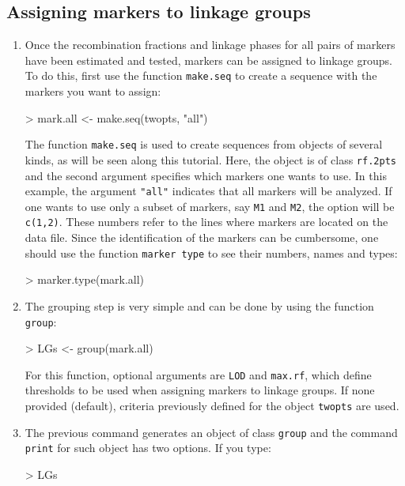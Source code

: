 \documentclass[letterpaper,12pt,oneside]{article}
\begin{document}
\subsection{Assigning markers to linkage groups}
\begin{enumerate}
\item Once the recombination fractions and linkage phases for all pairs of markers have been estimated and tested, markers can be assigned to linkage groups. To do this, first use the function {\tt make.seq} to create a sequence with the markers you want to assign:
\begin{Schunk}
\begin{Sinput}
> mark.all <- make.seq(twopts, "all")
\end{Sinput}
\end{Schunk}
The function {\tt make.seq} is used to create sequences from objects of several kinds, as will be seen along this tutorial. Here, the object is of class {\tt rf.2pts} and the second argument specifies which markers one wants to use. In this example, the argument {\tt "all"} indicates that all markers will be analyzed. If one wants to use only a subset of markers, say {\tt M1} and {\tt M2}, the option will be {\tt c(1,2)}. These numbers refer to the lines where markers are located on the data file. Since the identification of the markers can be cumbersome, one should use the function {\tt marker type} to see their numbers, names and types:

\begin{Schunk}
\begin{Sinput}
> marker.type(mark.all)
\end{Sinput}
\end{Schunk}

\item The grouping step is very simple and can be done by using the function {\tt group}:
\begin{Schunk}
\begin{Sinput}
> LGs <- group(mark.all)
\end{Sinput}
\end{Schunk}
For this function, optional arguments are {\tt LOD} and {\tt max.rf}, which define thresholds to be used when assigning markers to linkage groups. If none provided (default), criteria previously defined for the object {\tt twopts} are used.

\item The previous command generates an object of class {\tt group} and the command {\tt print} for such object has two options. If you type:
\begin{Schunk}
\begin{Sinput}
> LGs
\end{Sinput}
\end{Schunk}


\end{enumerate}
\end{document}
